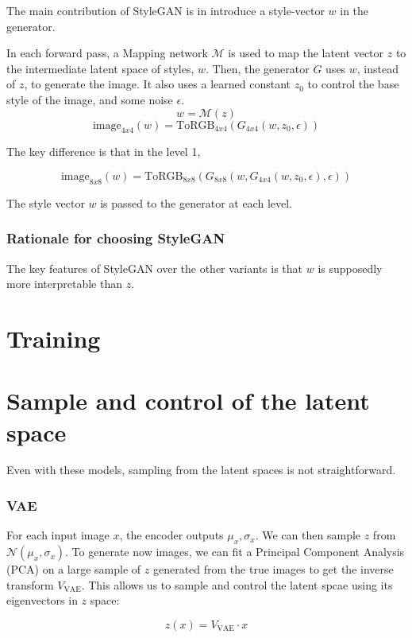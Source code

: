 \documentclass{article}
\begin{document}
The main contribution of StyleGAN is in introduce a style-vector $w$ in the generator.

In each forward pass, a Mapping network $\mathcal{M}$ is used to map the latent vector $z$ to the intermediate latent space of styles, $w$.
Then, the generator $G$ uses $w$, instead of $z$, to generate the image. It also uses a learned constant $z_0$ to control the base style of the image, and some noise $\epsilon$.
\[w = \mathcal{M}(z)\]
\[\text{image}_{4x4}(w) = \text{ToRGB}_{4x4}(G_{4x4}(w, z_0, \epsilon))\]

The key difference is that in the level 1, 

\[\text{image}_{8x8}(w) = \text{ToRGB}_{8x8}(G_{8x8}(w, G_{4x4}(w, z_0, \epsilon), \epsilon))\]

The style vector $w$ is passed to the generator at each level.

\subsubsection*{Rationale for choosing StyleGAN}

The key features of StyleGAN over the other variants is that $w$ is supposedly more interpretable than $z$.

\section{Training}

\section{Sample and control of the latent space}

Even with these models, sampling from the latent spaces is not straightforward.

\subsubsection*{VAE}

For each input image $x$, the encoder outputs $\mu_x, \sigma_x$. We can then sample $z$ from $\mathcal{N}(\mu_x, \sigma_x)$.
To generate now images, we can fit a Principal Component Analysis (PCA) on a large sample of $z$ generated from the true images to get the inverse transform $V_{\text{VAE}}$.
This allows us to sample and control the latent spcae using its eigenvectors in $z$ space:

\[z(x) = V_{\text{VAE}} \cdot x\]
\end{document}

